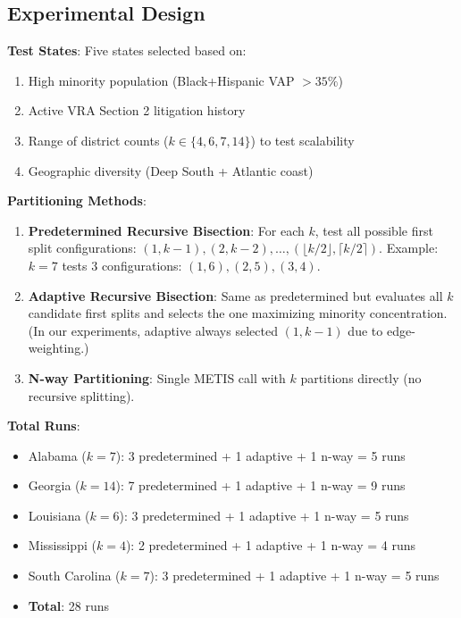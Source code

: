 \subsection{Experimental Design}

\textbf{Test States}:
Five states selected based on:
\begin{enumerate}
    \item High minority population (Black+Hispanic VAP $> 35\%$)
    \item Active VRA Section 2 litigation history
    \item Range of district counts ($k \in \{4, 6, 7, 14\}$) to test scalability
    \item Geographic diversity (Deep South + Atlantic coast)
\end{enumerate}

\textbf{Partitioning Methods}:
\begin{enumerate}
    \item \textbf{Predetermined Recursive Bisection}: For each $k$, test all possible first split configurations: $(1, k-1), (2, k-2), \ldots, (\lfloor k/2 \rfloor, \lceil k/2 \rceil)$. Example: $k=7$ tests 3 configurations: $(1,6), (2,5), (3,4)$.

    \item \textbf{Adaptive Recursive Bisection}: Same as predetermined but evaluates all $k$ candidate first splits and selects the one maximizing minority concentration. (In our experiments, adaptive always selected $(1, k-1)$ due to edge-weighting.)

    \item \textbf{N-way Partitioning}: Single METIS call with $k$ partitions directly (no recursive splitting).
\end{enumerate}

\textbf{Total Runs}:
\begin{itemize}
    \item Alabama ($k=7$): 3 predetermined + 1 adaptive + 1 n-way = 5 runs
    \item Georgia ($k=14$): 7 predetermined + 1 adaptive + 1 n-way = 9 runs
    \item Louisiana ($k=6$): 3 predetermined + 1 adaptive + 1 n-way = 5 runs
    \item Mississippi ($k=4$): 2 predetermined + 1 adaptive + 1 n-way = 4 runs
    \item South Carolina ($k=7$): 3 predetermined + 1 adaptive + 1 n-way = 5 runs
    \item \textbf{Total}: 28 runs
\end{itemize}

